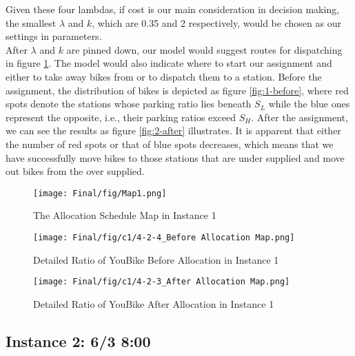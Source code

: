 \documentclass[a4paper, 12pt]{article}%
\theoremstyle{definition}
\begin{document}
\noindent Given these four lambdas, if cost is our main consideration in decision making, the smallest $\lambda$ and $k$, which are 0.35 and 2 respectively, would be chosen as our settings in parameters.\\


\noindent After $\lambda$ and $k$ are pinned down, our model would suggest routes for dispatching in figure \ref{fig:1-map}. The model would also indicate where to start our assignment and either to take away bikes from or to dispatch them to a station. Before the assignment, the distribution of bikes is depicted as figure \ref{fig:1-before}, where red spots denote the stations whose parking ratio lies beneath $S_L$ while the blue ones represent the opposite, i.e., their parking ratios exceed $S_H$. After the assignment, we can see the results as figure \ref{fig:2-after} illustrates. It is apparent that either the number of red spots or that of blue spots decreases, which means that we have successfully move bikes to those stations that are under supplied and move out bikes from the over supplied.

\begin{figure}[hbt]
    \centering
    \texttt{[image: Final/fig/Map1.png]}
    \caption{The Allocation Schedule Map in Instance 1}
    \label{fig:1-map}
\end{figure}


\begin{figure}[hbt]
\centering
	\begin{minipage}[b]{0.45\textwidth}
		\texttt{[image: Final/fig/c1/4-2-4\_Before Allocation Map.png]}
		\caption{Detailed Ratio of YouBike Before Allocation in Instance 1}
		\label{fig:1-before}
	\end{minipage}
	\begin{minipage}[b]{0.05\textwidth}
		\quad
	\end{minipage}	
	\begin{minipage}[b]{0.45\textwidth}
		\texttt{[image: Final/fig/c1/4-2-3\_After Allocation Map.png]}
		\caption{Detailed Ratio of YouBike After Allocation in Instance 1}
		\label{fig:1-after}
	\end{minipage}
\end{figure}




\subsection{Instance 2: 6/3 8:00}
\end{document}
